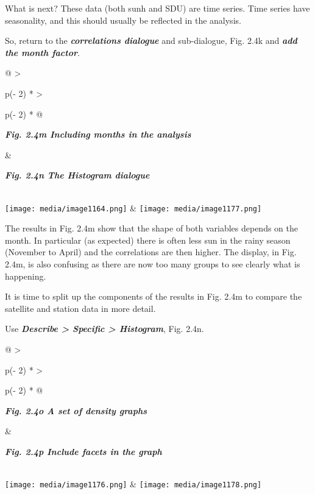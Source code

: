 \documentclass[
  letterpaper,
  DIV=11,
  numbers=noendperiod]{scrreprt}
\begin{document}
What is next? These data (both sunh and SDU) are time series. Time
series have seasonality, and this should usually be reflected in the
analysis.

So, return to the \textbf{\emph{correlations dialogue}} and
sub-dialogue, Fig. 2.4k and \textbf{\emph{add the month factor}}.

\begin{longtable}[]{@{}
  >{\raggedright\arraybackslash}p{(\columnwidth - 2\tabcolsep) * }
  >{\raggedright\arraybackslash}p{(\columnwidth - 2\tabcolsep) * }@{}}
\toprule\noalign{}
\begin{minipage}[b]{\linewidth}\raggedright
\textbf{\emph{Fig. 2.4m Including months in the analysis}}
\end{minipage} & \begin{minipage}[b]{\linewidth}\raggedright
\textbf{\emph{Fig. 2.4n The Histogram dialogue}}
\end{minipage} \\
\midrule\noalign{}
\endhead
\bottomrule\noalign{}
\endlastfoot
\texttt{[image: media/image1164.png]}
&
\texttt{[image: media/image1177.png]} \\
\end{longtable}

The results in Fig. 2.4m show that the shape of both variables depends
on the month. In particular (as expected) there is often less sun in the
rainy season (November to April) and the correlations are then higher.
The display, in Fig. 2.4m, is also confusing as there are now too many
groups to see clearly what is happening.

It is time to split up the components of the results in Fig. 2.4m to
compare the satellite and station data in more detail.

Use \textbf{\emph{Describe \textgreater{} Specific \textgreater{}
Histogram}}, Fig. 2.4n.

\begin{longtable}[]{@{}
  >{\raggedright\arraybackslash}p{(\columnwidth - 2\tabcolsep) * }
  >{\raggedright\arraybackslash}p{(\columnwidth - 2\tabcolsep) * }@{}}
\toprule\noalign{}
\begin{minipage}[b]{\linewidth}\raggedright
\textbf{\emph{Fig. 2.4o A set of density graphs}}
\end{minipage} & \begin{minipage}[b]{\linewidth}\raggedright
\textbf{\emph{Fig. 2.4p Include facets in the graph}}
\end{minipage} \\
\midrule\noalign{}
\endhead
\bottomrule\noalign{}
\endlastfoot
\texttt{[image: media/image1176.png]}
&
\texttt{[image: media/image1178.png]} \\
\end{longtable}
\end{document}
